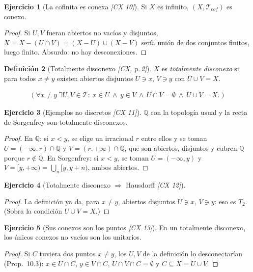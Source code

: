 \documentclass[11pt,a4paper]{article}
\newcommand{\lgc}[1]{\par\vspace{-3pt}\begin{gather*}\big(\;#1\;\big)\end{gather*}\vspace{-6pt}}
\theoremstyle{definition}
\newtheorem{definicion}{Definición}[section]
\newtheorem{ejercicio}[definicion]{Ejercicio}
\theoremstyle{plain}
\newcommand{\fnt}[1]{{\normalfont\small\itshape\color{gray!150!black}[#1]}}
\newcommand{\Q}{\mathbb{Q}}
\newcommand{\tp}{\mathcal{T}}
\begin{document}
\begin{ejercicio}[La cofinita es conexa \fnt{CX 10}]
Si $X$ es infinito, $(X,\tp_{cof})$ es conexo.
\end{ejercicio}

\begin{proof}
Si $U,V$ fueran abiertos no vacíos y disjuntos, $X=X-(U\cap V)=(X-U)\cup(X-V)$ sería unión de dos conjuntos finitos, luego finito. Absurdo: no hay desconexiones.
\end{proof}

\begin{definicion}[Totalmente disconexo \fnt{CX, p.\,2}]
$X$ es \emph{totalmente disconexo} si para todos $x\ne y$ existen abiertos disjuntos $U\ni x$, $V\ni y$ con $U\cup V=X$.
\lgc{\forall x\ne y\ \exists U,V\in\tp:\ x\in U\ \wedge\ y\in V\ \wedge\ U\cap V=\emptyset\ \wedge\ U\cup V=X.}
\end{definicion}

\begin{ejercicio}[Ejemplos no discretos \fnt{CX 11}]
$\Q$ con la topología usual y la recta de Sorgenfrey son totalmente disconexos.
\end{ejercicio}

\begin{proof}
En $\Q$: si $x<y$, se elige un irracional $r$ entre ellos y se toman $U=(-\infty,r)\cap\Q$ y $V=(r,+\infty)\cap\Q$, que son abiertos, disjuntos y cubren $\Q$ porque $r\notin\Q$. En Sorgenfrey: si $x<y$, se toman $U=(-\infty,y)$ y $V=[y,+\infty)=\bigcup_n[y,y+n)$, ambos abiertos.
\end{proof}

\begin{ejercicio}[Totalmente disconexo $\Rightarrow$ Hausdorff \fnt{CX 12}]
\end{ejercicio}

\begin{proof}
La definición ya da, para $x\ne y$, abiertos disjuntos $U\ni x$, $V\ni y$: eso es $T_2$. (Sobra la condición $U\cup V=X$.)
\end{proof}

\begin{ejercicio}[Sus conexos son los puntos \fnt{CX 13}]
En un totalmente disconexo, los únicos conexos no vacíos son los unitarios.
\end{ejercicio}

\begin{proof}
Si $C$ tuviera dos puntos $x\ne y$, los $U,V$ de la definición lo desconectarían (Prop.\ 10.3): $x\in U\cap C$, $y\in V\cap C$, $U\cap V\cap C=\emptyset$ y $C\subseteq X=U\cup V$.
\end{proof}
\end{document}
